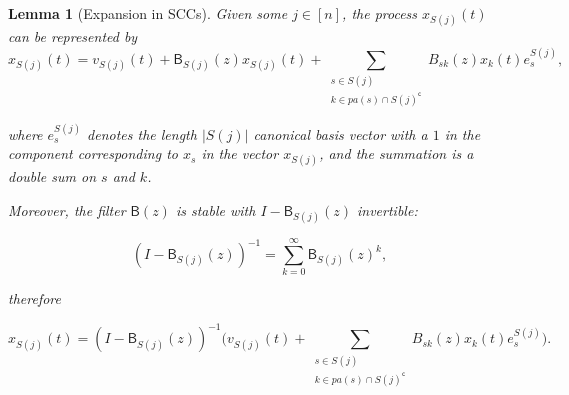 \documentclass{statsoc}
\def\B{\mathsf{B}}  %
\newcommand{\pa}[1]{pa(#1)}  %
\newtheorem{lemma}{Lemma}
\def\c{\mathsf{c}}  %
\begin{document}
\begin{lemma}[Expansion in SCCs]
  \label{lem:scc_expansion}
  Given some $j \in [n]$, the process $x_{S(j)}(t)$ can be represented
  by
  \begin{equation}
    \label{eqn:scc_parent_expansion}
    x_{S(j)}(t) = v_{S(j)}(t) + \B_{S(j)}(z)x_{S(j)}(t) + \sum_{\substack{s \in S(j) \\ k \in \pa{s} \cap S(j)^\c}} B_{sk}(z)x_k(t)e_s^{S(j)},
  \end{equation}

  where $e_s^{S(j)}$ denotes the length $|S(j)|$ canonical basis
  vector with a $1$ in the component corresponding to $x_s$ in the
  vector $x_{S(j)}$, and the summation is a double sum on $s$ and $k$.

  Moreover, the filter $\B(z)$ is stable with $I - \B_{S(j)}(z)$
  invertible:

  \begin{equation}
    \label{eqn:scc_inversion}
    (I - \B_{S(j)}(z))^{-1} = \sum_{k = 0}^\infty \B_{S(j)}(z)^k,
  \end{equation}

  therefore

  \begin{equation}
    \label{eqn:scc_parent_expansion_inverted}
    x_{S(j)}(t) = (I - \B_{S(j)}(z))^{-1} \big(v_{S(j)}(t) + \sum_{\substack{s \in S(j) \\ k \in \pa{s} \cap S(j)^\c}} B_{sk}(z)x_k(t)e_s^{S(j)}\big).
  \end{equation}
  
\end{lemma}
\end{document}
